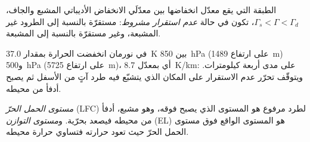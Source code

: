 \begin{definition}\label{def:b2:atmospheric-thermodynamics:instability}
الطبقة التي يقع معدّل انخفاضها بين معدّلَي الانخفاض الأديباتي المشبع والجاف،
$\Gamma_s < \Gamma < \Gamma_d$، تكون في حالة \emph{عدم استقرار مشروط}:
مستقرّة بالنسبة إلى الطرود غير المشبعة، وغير مستقرّة بالنسبة إلى المشبعة.
\end{definition}

في نورمان انخفضت الحرارة بمقدار \qty{37.0}{K} بين \qty{850}{hPa} (على ارتفاع \qty{1489}{m})
و\qty{500}{hPa} (على ارتفاع \qty{5725}{m})، أي بمعدّل \qty{8.7}{K/km}:  على مدى أربعة كيلومترات.
ويتوقّف تحرّر عدم الاستقرار على المكان الذي يتشبّع فيه طرد آتٍ من الأسفل ثم
يصبح أدفأ من محيطه.

\begin{definition}\label{def:b2:atmospheric-thermodynamics:parcel-levels}
\emph{مستوى الحمل الحرّ} (LFC) لطرد مرفوع هو
المستوى الذي يصبح فوقه، وهو مشبع، أدفأ من محيطه فيصعد بحرّية.
و\emph{مستوى التوازن} (EL) هو المستوى الواقع فوق مستوى الحمل الحرّ حيث تعود
حرارته فتساوي حرارة محيطه.
\end{definition}

